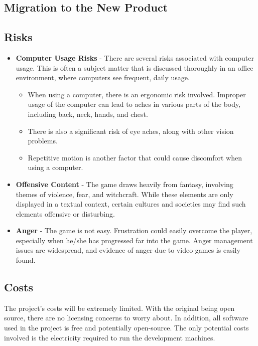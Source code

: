 \documentclass[12pt, titlepage]{article}
\begin{document}
	\subsection{Migration to the New Product}

	\subsection{Risks}

	\begin{itemize}
		\item \textbf{Computer Usage Risks} - There are several risks associated with computer usage. This is often a subject matter that is discussed thoroughly in an office environment, where computers see frequent, daily usage.
		\begin{itemize}
			\item When using a computer, there is an ergonomic risk involved. Improper usage of the computer can lead to aches in various parts of the body, including back, neck, hands, and chest.
			\item There is also a significant risk of eye aches, along with other vision problems.
			\item Repetitive motion is another factor that could cause discomfort when using a computer.
		\end{itemize}
		\item \textbf{Offensive Content} - The game draws heavily from fantasy, involving themes of violence, fear, and witchcraft. While these elements are only displayed in a textual context, certain cultures and societies may find such elements offensive or disturbing.
		\item \textbf{Anger} - The game is not easy. Frustration could easily overcome the player, especially when he/she has progressed far into the game. Anger management issues are widespread, and evidence of anger due to video games is easily found.
	\end{itemize}

	\subsection{Costs}

	The project's costs will be extremely limited. With the original being open source, there are no licensing concerns to worry about. In addition, all software used in the project is free and potentially open-source. The only potential costs involved is the electricity required to run the development machines.
\end{document}
